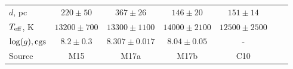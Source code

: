 \begin{landscape}
\begin{table}
\begin{tabular}{lcccccc}
                \hline
                $d$, pc                     & $220\pm50$                & $367\pm26$                & $146\pm20$            & $151\pm14$            \\
                $T_{\rm eff}$, K            & $13200\pm700$             & $13300\pm1100$            & $14000\pm2100$        & $12500\pm2500$        \\
                $\log(g), {\rm cgs}$        & $8.2\pm0.3$               & $8.307\pm0.017$           & $8.04\pm0.05$         & -                     \\
                \hline
                Source                      & M15                       & M17a                      & M17b                  & C10                   \\
                \hline
                \hline
            \end{tabular}
        \end{table}

\end{landscape}


